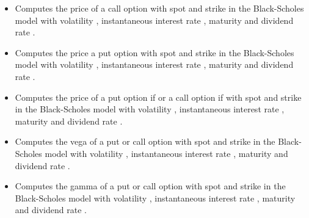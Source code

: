 



\begin{itemize}
  \item 
    \sshortdescribe Computes the price of a call option with spot 
    and strike  in the Black-Scholes model with volatility ,
    instantaneous interest rate , maturity  and dividend rate
    .

  \item 
    \sshortdescribe Computes the price a put option with spot 
    and strike  in the Black-Scholes model with volatility ,
    instantaneous interest rate , maturity  and dividend rate
    .

  \item 
    \sshortdescribe Computes the price of a put option if  or a
    call option if  with spot  and strike  in the
    Black-Scholes model with volatility , instantaneous interest rate
    , maturity  and dividend rate .

  \item 
    \sshortdescribe Computes the vega of a put or call option with spot 
    and strike  in the Black-Scholes model with volatility ,
    instantaneous interest rate , maturity  and dividend rate
    .

  \item 
    \sshortdescribe Computes the gamma of a put or call option with spot 
    and strike  in the Black-Scholes model with volatility ,
    instantaneous interest rate , maturity  and dividend rate
    .
\end{itemize}

